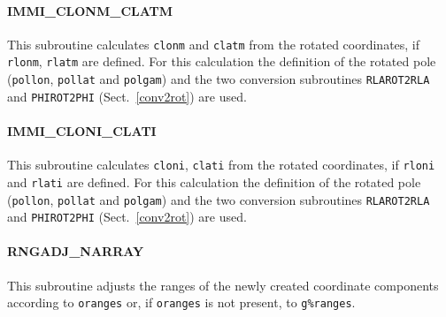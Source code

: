 \documentclass[11pt,twoside]{article}
\begin{document}
\paragraph{IMMI\_CLONM\_CLATM\\}
This subroutine calculates \verb|clonm| and \verb|clatm| from the rotated 
coordinates, if \verb|rlonm|, \verb|rlatm| are defined.
For this calculation the definition of the rotated pole (\verb|pollon|,
\verb|pollat| and \verb|polgam|) and the two conversion
subroutines \verb|RLAROT2RLA| and \verb|PHIROT2PHI|
(Sect.~\ref{conv2rot}) are used. 
\paragraph{IMMI\_CLONI\_CLATI\\}
This subroutine calculates \verb|cloni|, \verb|clati| from the rotated 
coordinates, if \verb|rloni| and \verb|rlati| are defined.
For this calculation the definition of the rotated pole (\verb|pollon|,
\verb|pollat| and \verb|polgam|) and the two conversion subroutines
\verb|RLAROT2RLA| and \verb|PHIROT2PHI| (Sect.~\ref{conv2rot}) are used.
\paragraph{RNGADJ\_NARRAY\\}
This subroutine adjusts the ranges of the newly created coordinate
components according to \verb|oranges| or, if \verb|oranges| is not
present, to \verb|g%ranges|.
\end{document}
